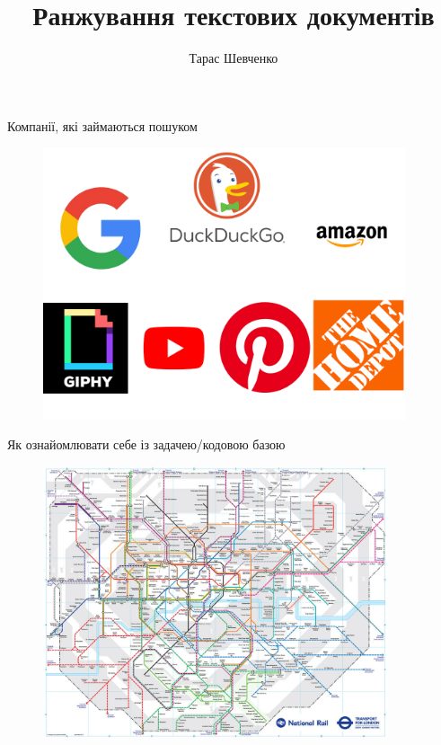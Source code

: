 \documentclass[10pt]{beamer}
\title{Ранжування текстових документів}
\date{}
\author{Тарас Шевченко}
\institute{Rails Reactor / Giphy}
\begin{document}
\maketitle


\begin{frame}{Компанії, які займаються пошуком}
        \begin{center}
            \begin{figure}
            \includegraphics[height=8cm,natwidth=1024,natheight=768]{images/search_companies.png}
            \end{figure}
        \end{center}
\end{frame}

\begin{frame}{Як ознайомлювати себе із задачею/кодовою базою}
        \begin{center}
            \begin{figure}
            \includegraphics[height=8cm]{images/London_rail.png}
            \end{figure}
        \end{center}
\end{frame}
\end{document}
